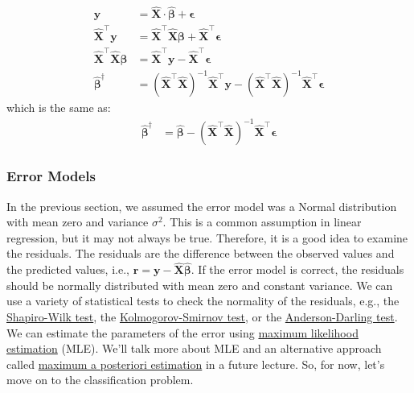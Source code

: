 \documentclass{article}[11pt]
\begin{document}
\begin{align*}
   \mathbf{y} 
   & = \hat{\mathbf{X}}\cdot\hat{\mathbf{\beta}} + \mathbf{\epsilon} \\
   \hat{\mathbf{X}}^{\top}\mathbf{y}
   & = \hat{\mathbf{X}}^{\top}\hat{\mathbf{X}}\mathbf{\beta} + \hat{\mathbf{X}}^{\top}\mathbf{\epsilon} \\
   \hat{\mathbf{X}}^{\top}\hat{\mathbf{X}}\mathbf{\beta} 
    & = \hat{\mathbf{X}}^{\top}\mathbf{y} - \hat{\mathbf{X}}^{\top}\mathbf{\epsilon} \\
    \hat{\mathbf{\beta}}^{\dagger} 
    & = \left(\hat{\mathbf{X}}^{\top}\hat{\mathbf{X}}\right)^{-1}\hat{\mathbf{X}}^{\top}\mathbf{y} - \left(\hat{\mathbf{X}}^{\top}\hat{\mathbf{X}}\right)^{-1}\hat{\mathbf{X}}^{\top}\mathbf{\epsilon}
\end{align*}
which is the same as:
\begin{align*}
   \hat{\mathbf{\beta}}^{\dagger} 
    & = \hat{\mathbf{\beta}} - \left(\hat{\mathbf{X}}^{\top}\hat{\mathbf{X}}\right)^{-1}\hat{\mathbf{X}}^{\top}\mathbf{\epsilon}
\end{align*}

\subsubsection*{Error Models}
In the previous section, we assumed the error model was a Normal distribution with mean zero and variance $\sigma^{2}$. 
This is a common assumption in linear regression, but it may not always be true. Therefore, it is a good idea to examine the residuals. The residuals are the difference between the observed values and the predicted values, i.e., $\mathbf{r} = \mathbf{y} - \hat{\mathbf{X}}\hat{\mathbf{\beta}}$. 
If the error model is correct, the residuals should be normally distributed with mean zero and constant variance. 
We can use a variety of statistical tests to check the normality of the residuals, e.g., 
the \href{https://en.wikipedia.org/wiki/Shapiro–Wilk_test}{Shapiro-Wilk test}, the \href{https://en.wikipedia.org/wiki/Kolmogorov–Smirnov_test}{Kolmogorov-Smirnov test}, 
or the \href{https://en.wikipedia.org/wiki/Anderson–Darling_test}{Anderson-Darling test}.
We can estimate the parameters of the error using \href{https://en.wikipedia.org/wiki/Maximum_likelihood_estimation}{maximum likelihood estimation} (MLE).
We'll talk more about MLE and an alternative approach called \href{https://en.wikipedia.org/wiki/Maximum_a_posteriori_estimation}{maximum a posteriori estimation} in a future lecture.
So, for now, let's move on to the classification problem.
\end{document}
